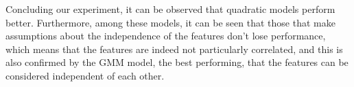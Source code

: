 
Concluding our experiment, it can be observed that quadratic models perform better.
Furthermore, among these models, it can be seen that those that make assumptions about the independence of the features don't lose performance,
which means that the features are indeed not particularly correlated, and this is also confirmed by the GMM model, the best performing,
that the features can be considered independent of each other.